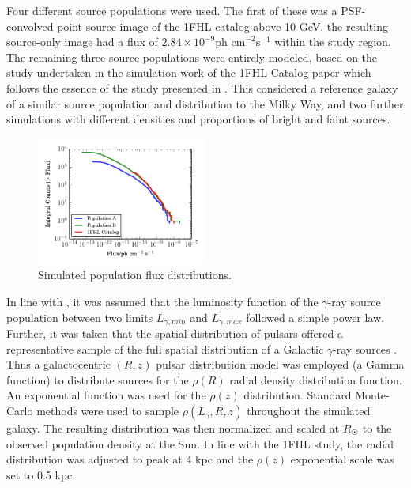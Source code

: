 \documentclass{PoS}
\begin{document}
Four different source populations were used. The first of these was a PSF-convolved point source image of the 1FHL catalog above 10 GeV. the resulting source-only image had a flux of $2.84\times 10^{-9} \text{ph cm}^{-2}\text{s}^{-1}$ within the study region. The remaining three source populations were entirely modeled, based on the study undertaken in the simulation work of the 1FHL Catalog paper \cite[p.59]{1fhl} which follows the essence of the study presented in \cite{Strong}. This considered a reference galaxy of a similar source population and distribution to the Milky Way, and two further simulations with different densities and proportions of bright and faint sources.

\begin{figure}
\vspace{-10pt}
      \includegraphics[width=0.5\textwidth]{figures/log_N_log_S.pdf}
  \caption{Simulated population flux distributions.}
\vspace{-10pt}
\end{figure}

In line with \cite{Strong}, it was assumed that the luminosity function of the $\gamma$-ray source population between two limits $L_{\gamma, min}$ and $L_{\gamma, max}$ followed a simple power law. Further, it was taken that the spatial distribution of pulsars offered a representative sample of the full spatial distribution of a Galactic $\gamma$-ray sources \cite[p.2]{Strong}. Thus a galactocentric $(R, z)$ pulsar distribution model was employed \cite[p.7]{Lorimer} (a Gamma function) to distribute sources for the $\rho(R)$ radial density distribution function. An exponential function was used for the $\rho(z)$ distribution. Standard Monte-Carlo methods were used to sample $\rho(L_{\gamma}, R, z)$ throughout the simulated galaxy. The resulting distribution was then normalized and scaled at $R_{\astrosun}$ to the observed population density at the Sun. In line with the 1FHL study, the radial distribution was adjusted to peak at 4 kpc and the $\rho(z)$ exponential scale was set to 0.5 kpc.
\end{document}
